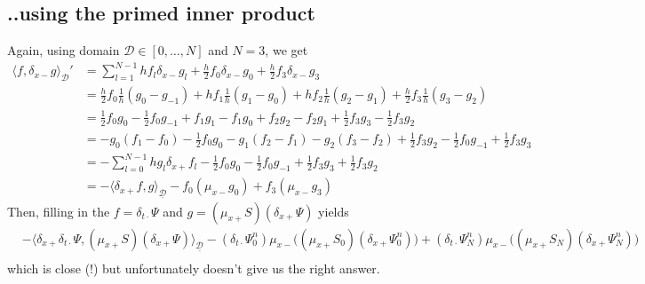 \documentclass[dvipsnames]{article}
\def\dxp{\delta_{x+}}
\def\dxm{\delta_{x-}}
\def\mup{\mu_{x+}}
\def\mum{\mu_{x-}}
\def\dtd{\delta_{t\cdot}}
\begin{document}
\subsection{..using the primed inner product}\label{app:primed}
Again, using domain $\mathcal{D} \in [0, \hdots, N]$ and $N = 3$, we get
\begin{equation}
\begin{aligned}
    \langle f, \dxm g\rangle_\mathcal{D}' &= \sum_{l=1}^{N-1} hf_l\dxm g_l + \frac{h}{2}f_0\dxm g_0 + \frac{h}{2}f_3\dxm g_3\\
    &= \frac{h}{2}f_0\frac{1}{h}(g_0-g_{-1})+hf_1\frac{1}{h}(g_1-g_0)+ hf_2\frac{1}{h}(g_2-g_1)+ \frac{h}{2}f_3\frac{1}{h}(g_3-g_{2})\\
    &= \frac{1}{2}f_0g_0-\frac{1}{2}f_0g_{-1}+f_1g_1-f_1g_0+f_2g_2-f_2g_1+\frac{1}{2}f_3g_3-\frac{1}{2}f_3g_2\\
    &= -g_0(f_1-f_0) - \frac{1}{2}f_0g_0-g_1(f_2-f_1)-g_2(f_3-f_2) + \frac{1}{2}f_3g_2-\frac{1}{2}f_0g_{-1}+\frac{1}{2}f_3g_3\\
    &= -\sum_{l=0}^{N-1}hg_l\dxp f_l - \frac{1}{2}f_0g_0-\frac{1}{2}f_0g_{-1}+\frac{1}{2}f_3g_3+\frac{1}{2}f_3g_2\\
    &= -\langle \dxp f, g \rangle_{\underline{\mathcal{D}}}-f_0(\mum g_0)+f_3(\mum g_3)
\end{aligned}
    \end{equation}
Then, filling in the $f=\dtd\Psi$ and $g = (\mup S)(\dxp \Psi)$ yields
\begin{equation}
    \begin{aligned}
        &-\langle \dxp \dtd\Psi, (\mup S)(\dxp \Psi)\rangle_\mathcal{\underline{D}} - (\dtd\Psi_0^n)\mum\big((\mup S_0)(\dxp \Psi_0^n)\big) + (\dtd\Psi_N^n)\mum\big((\mup S_N)(\dxp \Psi_N^n)\big)\\
    \end{aligned}
\end{equation}
which is close (!) but unfortunately doesn't give us the right answer. 
\end{document}
